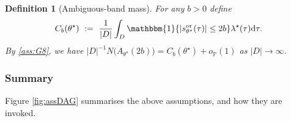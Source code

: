 \documentclass{statsoc}
\newtheorem{definition}[definition]{Definition}
\newcommand{\dd}{\mathrm{d}}
\newcommand{\1}{\mathbbm{1}}
\begin{document}
\begin{definition}[Ambiguous-band mass]\label{def:C_b}
For any $b>0$ define
\[
C_b(\theta^\star)\ :=\ \frac{1}{|D|}\int_D \1\{|s_{\theta^\star}^{\rm or}(\tau)|\le 2b\} \lambda^\star(\tau) \dd\tau.
\]
By \cref{ass:G8}, we have $|D|^{-1}N\!\big(A_{\theta^\star}(2b)\big)=C_b(\theta^\star)+o_{\mathbb P}(1)$ as $|D|\to\infty$.
\end{definition}

\subsubsection{Summary}

Figure \ref{fig:assDAG} summarises the above assumptions, and how they are invoked.

\end{document}
